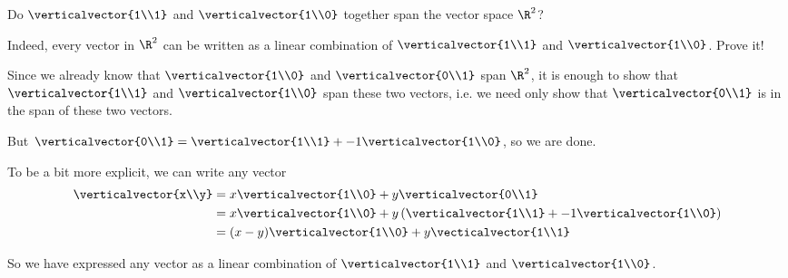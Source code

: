 \documentclass{ximera}
\begin{document}
\begin{question}
  Do $\verticalvector{1\\1}$ and $\verticalvector{1\\0}$ together span the vector space $\R^2$?

  \begin{solution}
    \begin{multiple-choice}
    \end{multiple-choice}
  \end{solution}

  Indeed, every vector in $\R^2$ can be written as a linear
  combination of $\verticalvector{1\\1}$ and $\verticalvector{1\\0}$.
  Prove it!

  \begin{free-response}
    Since we already know that $\verticalvector{1\\0}$ and $\verticalvector{0\\1}$ span $\R^2$,
    it is enough to show that $\verticalvector{1\\1}$ and $\verticalvector{1\\0}$ span these two vectors, i.e.
    we need only show that $\verticalvector{0\\1}$ is in the span of these two vectors.
    
    But $\verticalvector{0\\1} = \verticalvector{1\\1} +-1\verticalvector{1\\0}$, so we are done.
    
    To be a bit more explicit, we can write any vector \begin{align*}
      \verticalvector{x\\y} &= x\verticalvector{1\\0}+ y\verticalvector{0\\1}\\
      &= x\verticalvector{1\\0}+ y\left(\verticalvector{1\\1} +-1\verticalvector{1\\0}\right)\\
      &=(x-y)\verticalvector{1\\0}+y\vecticalvector{1\\1}
    \end{align*}
    
    So we have expressed any vector as a linear combination of $\verticalvector{1\\1}$ and $\verticalvector{1\\0}$.
  \end{free-response} 
\end{question}
\end{document}
